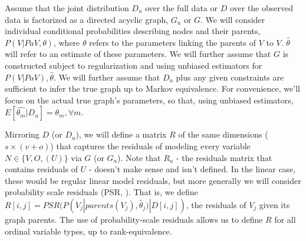 \documentclass{article}
\begin{document}
\begin{table}[h]
\centering
{}
\smallskip
\caption{Notation}
\label{tab:notation}
\end{table}

Assume that the joint distribution $D_{u}$ over the full data or $D$ over the observed data is factorized as a directed acyclic graph, $G_{u}$ or $G$.  We will consider individual conditional probabilities describing nodes and their parents, $P(V | Pa{V}, \theta)$, where $\theta$ refers to the parameters linking  the parents of $V$ to $V$.  $\hat{\theta}$ will refer to an estimate of these parameters.  We will further assume that $G$ is constructed subject to regularization and using unbiased estimators for $P(V | Pa{V}), \hat{\theta}$.  We will further assume that $D_u$ plus any given constraints are sufficient to infer the true graph up to Markov equivalence.  For convenience, we'll focus on the actual true graph's parameters, so that, using unbiased estimators, $E[\hat{\theta_m}|D_u] = \theta_m, \forall m$.

Mirroring $D$ (or $D_u$), we will define a matrix $R$ of the same dimensions ($s \times (v + o)$) that captures the residuals of modeling every variable $N \in \{V, O, (U)\}$ via $G$ (or $G_u$).  Note that $R_u$ - the residuals matrix that contains residuals of $U$ - doesn't make sense and isn't defined.  In the linear case, these would be regular linear model residuals, but more generally we will consider probability scale residuals (PSR, \cite{shepherd_probability-scale_2016}).  That is, we define $R[i, j] = PSR(P(V_j | parents(V_j), \hat{\theta}_j) | D[i, j])$, the residuals of $V_j$ given its graph parents.  The use of probability-scale residuals allows us to define $R$ for all ordinal variable types, up to rank-equivalence.
\end{document}
